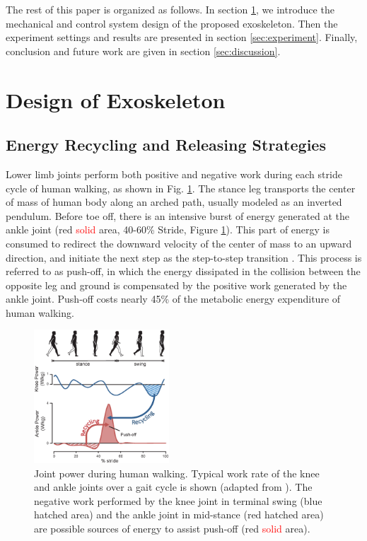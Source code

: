 \documentclass[twocolumn,cleanfoot,10pt]{asme2ej}
\begin{document}
The rest of this paper is organized as follows.
In section \ref{sec:design}, we introduce the mechanical and control system design of the proposed exoskeleton.
Then the experiment settings and results are presented in section \ref{sec:experiment}.
Finally, conclusion and future work are given in section \ref{sec:discussion}.


\section{Design of Exoskeleton}
\label{sec:design}

\subsection{Energy Recycling and Releasing Strategies}
\label{subsec:Biomechanics}

Lower limb joints perform both positive and negative work during each stride cycle of human walking, as shown in Fig. \ref{fig:work}.
The stance leg transports the center of mass of human body along an arched path, usually modeled as an inverted pendulum\cite{RN13}.
Before toe off, there is an intensive burst of energy generated at the ankle joint (red \textcolor{red}{solid} area, 40-60\% Stride, Figure \ref{fig:work}).
This part of energy is consumed to redirect the downward velocity of the center of mass to an upward direction, and initiate the next step as the step-to-step transition \cite{RN14}.
This process is referred to as push-off, in which the energy dissipated in the collision between the opposite leg and ground is compensated by the positive work generated by the ankle joint.
Push-off costs nearly 45\% of the metabolic energy expenditure of human walking\cite{RN15}.

\begin{figure}[b]
	\centering
	\includegraphics[width=0.45\textwidth]{Figure1.eps}
	\caption{Joint power during human walking.
	Typical work rate of the knee and ankle joints over a gait cycle is shown (adapted from \cite{RN2}).
	The negative work performed by the knee joint in terminal swing (blue hatched area) and the ankle joint in mid-stance (red hatched area) are possible sources of energy to assist push-off (red \textcolor{red}{solid} area).}
	\label{fig:work}
\end{figure}
\end{document}
